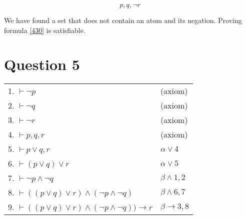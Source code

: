 \documentclass[10pt,a4paper]{article}
\begin{document}
\begin{equation}
\label{4311}
p,q,\neg r
\end{equation}

We have found a set that does not contain an atom and its negation. Proving formula \ref{430} is satisfiable.


\section{Question 5}

\begin{tabular}{ll}
1. $\vdash \neg p$     &                                    (axiom) \\
2. $\vdash \neg q$ & (axiom)\\
3. $\vdash \neg r$ & (axiom)\\
4. $\vdash p,q,r$ & (axiom)\\
5. $\vdash p \vee q,r $              &           $\alpha \vee 4$\\
6. $\vdash ( p \vee q ) \vee r$     &            $\alpha \vee 5$\\
7. $\vdash \neg p \wedge \neg q$         &            $\beta \wedge 1,2$\\
8. $\vdash (( p \vee q ) \vee r ) \wedge (\neg p \wedge \neg q) $ & $\beta \wedge 6,7$     \\
9. $\vdash (( p \vee q ) \vee r ) \wedge (\neg p \wedge \neg q)) \rightarrow r$ & $\beta \rightarrow 3,8$\\
\end{tabular}
\end{document}
